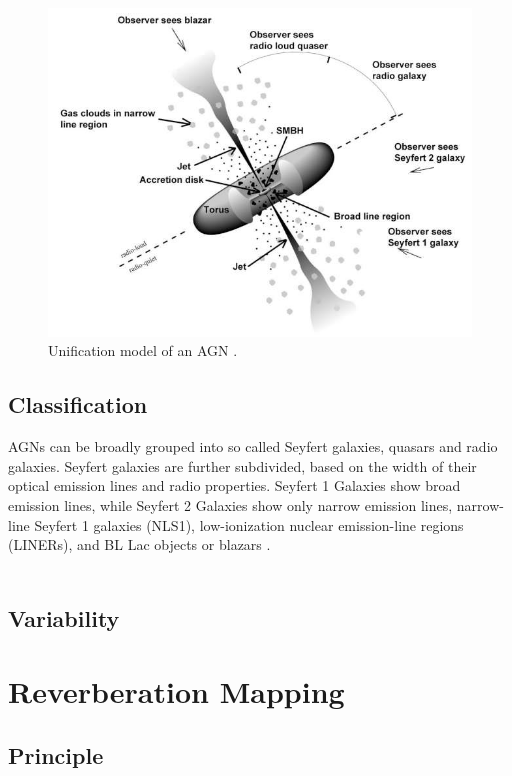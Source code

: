 \begin{figure}[!ht]
	\centering
	\includegraphics[width=\textwidth]{pictures/Chapter1/AGN_unified_model.jpg}
	\caption{Unification model of an AGN \parencite{fermi2025figure1}.}
	\label{fig:agn_sed}
\end{figure}

\subsection{Classification}

AGNs can be broadly grouped into so called Seyfert galaxies, quasars and radio galaxies. Seyfert galaxies are further subdivided, based on the width of their optical emission lines and radio properties. Seyfert 1 Galaxies show broad emission lines, while Seyfert 2 Galaxies show only narrow emission lines, narrow-line Seyfert 1 galaxies (NLS1), low-ionization nuclear emission-line regions (LINERs), and BL Lac objects or blazars \parencite{antonucci1993unified,urry1995unified}.\\\\

\subsection{Variability}

\section{Reverberation Mapping}


\subsection{Principle}


